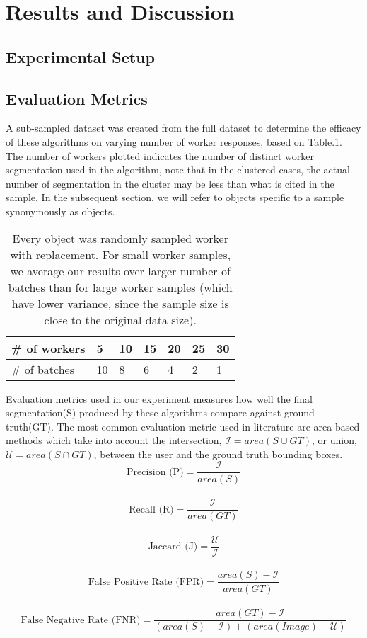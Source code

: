 \section{Results and Discussion\label{sec:results}}

  \subsection{Experimental Setup}

  \subsection{Evaluation Metrics}
   \par  A sub-sampled dataset was created from the full dataset to determine the efficacy of these algorithms on varying number of worker responses, based on Table.\ref{batch_sample}. The number of workers plotted indicates the number of distinct worker segmentation used in the algorithm, note that in the clustered cases, the actual number of segmentation in the cluster may be less than what is cited in the sample. In the subsequent section, we will refer to objects specific to a sample synonymously as objects.
  \begin{table}[ht]
  \centering
  \label{batch_sample}
  \caption{Every object was randomly sampled worker with replacement. For small worker samples, we average our results over larger number of batches than for large worker samples (which have lower variance, since the sample size is close to the original data size).}
  \begin{tabular}{l|llllll}
  \# of workers & 5  & 10 & 15 & 20 & 25 & 30 \\ \hline
  \# of batches & 10 & 8  & 6  & 4  & 2  & 1 
  \end{tabular}
  \end{table}
   \par Evaluation metrics used in our experiment measures how well the final segmentation(S) produced by these algorithms compare against ground truth(GT). The most common evaluation metric used in literature are area-based methods which take into account the intersection, $\mathcal{I}=area(S\cup GT)$, or union, $\mathcal{U}=area(S\cap GT)$, between the user and the ground truth bounding boxes.
    $$\text{Precision (P)} = \frac{\mathcal{I}}{area(S)}$$ \\
    $$\text{Recall (R)} = \frac{\mathcal{I}}{area(GT)}$$ \\
    $$\text{Jaccard (J)} = \frac{\mathcal{U}}{\mathcal{I}}$$ \\
    $$\text{False Positive Rate (FPR)}= \frac{area(S)-\mathcal{I}}{area(GT)}$$\\
    $$\text{False Negative Rate (FNR)}= \frac{area(GT)-\mathcal{I}}{(area(S)-\mathcal{I})+(area(Image)-\mathcal{U})}$$
